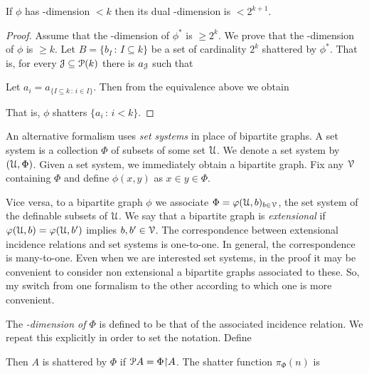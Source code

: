 \documentclass[sputnik.tex]{subfiles}
\begin{document}
\begin{proposition}
If $\phi$ has \vc-dimension $< k$ then its dual \vc-dimension is $< 2^{k+1}$.
\end{proposition}

\begin{proof}
Assume that the \vc-dimension of $\phi^*$ is $\ge 2^k$.
We prove that the \vc-dimension of $\phi$ is $\ge k$.
Let $B=\{b_I\,:\,I\subseteq k\}$ be a set of cardinality $2^k$ shattered by $\phi^*$. 
That is, for every $\J\subseteq \P(k)$ there is $a_\J$ such that


Let $a_i=a_{\{I\subseteq k\,:\, i\in I\}}$. Then from the equivalence above we obtain


That is, $\phi$ shatters $\{a_i\,:\,i<k\}$.
\end{proof}

An alternative formalism uses \emph{set systems\/} in place of bipartite graphs.
A set system is a collection $\Phi$ of subsets of some set $\U$.
We denote a set system by \emph{$(\U,\Phi)$}.
Given a set system, we immediately obtain a bipartite graph.
Fix any $\V$ containing $\Phi$ and define $\phi(x,y)$ as $x\in y\in\Phi$.

Vice versa, to a bipartite graph $\phi$ we associate $\Phi=\phi(\U,b)_{b\in\V}$, the set system of the definable subsets of $\U$.
We say that a bipartite graph is \emph{extensional\/} if $\phi(\U,b)=\phi(\U,b')$ implies $b,b'\in\V$.
The correspondence between extensional incidence relations and set systems is one-to-one.
In general, the correspondence is many-to-one.
Even when we are interested set systems, in the proof it may be convenient to consider non extensional a bipartite graphs associated to these. So, my switch from one formalism to the other according to which one is more convenient.

The \emph{\vc-dimension of $\Phi$} is defined to be that of the associated incidence relation.
We repeat this explicitly in order to set the notation. Define



Then $A$ is shattered by $\Phi$ if $\P A=\Phi{\restriction} A$. The shatter function \emph{$\pi_\Phi(n)$\/} is

\end{document}

